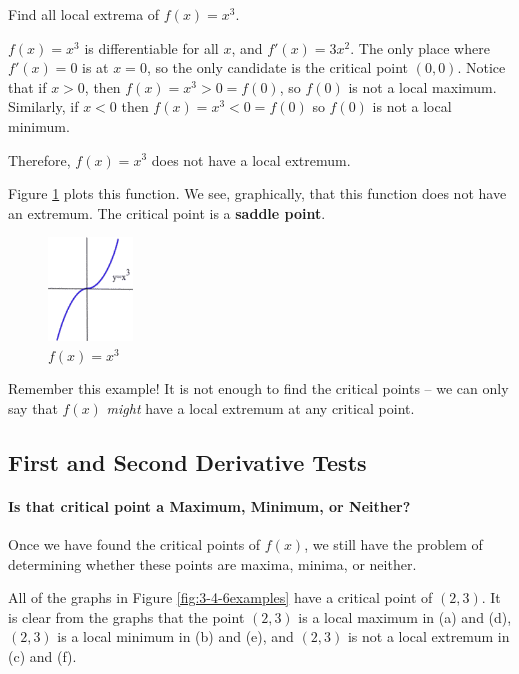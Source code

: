 \begin{example}
Find all local extrema of $f(x)=x^3$.

\begin{solution} $f(x)=x^3$ is differentiable for all $x$, and $f'(x)=3x^2$. The only place where $f'(x)=0$ is at $x=0$, so the only candidate is the critical point $(0,0)$. Notice that if $x>0$, then $f(x)=x^3>0=f(0)$, so $f(0)$ is not a local maximum. Similarly, if $x<0$ then $f(x)=x^3<0=f(0)$ so $f(0)$ is not a local minimum.

Therefore, $f(x)=x^3$ does not have a local extremum.

Figure \ref{fig:3-4-cube} plots this function. We see, graphically, that this function does not have an extremum. The critical point is a {\bf saddle point}.
\begin{figure}[!ht]
  \centering
    \includegraphics[width=0.2\textwidth]{img/chap3/image059.png}
    \caption{$f(x)=x^3$}
    \label{fig:3-4-cube}
\end{figure}
\end{solution}
\end{example}

Remember this example! It is not enough to find the critical points -- we can only say that $f(x)$ {\em might} have a local extremum at any critical point.

\subsection{First and Second Derivative Tests}

\paragraph*{Is that critical point a Maximum, Minimum, or Neither?}
Once we have found the critical points of $f(x)$, we still have the problem of determining whether these points are maxima, minima, or neither.

All of the graphs in Figure \ref{fig:3-4-6examples} have a critical point of $(2, 3)$. It is clear from the graphs that the point $(2,3)$ is a local maximum in (a) and (d), $(2,3)$ is a local minimum in (b) and (e), and $(2,3)$ is not a local extremum in (c) and (f).

